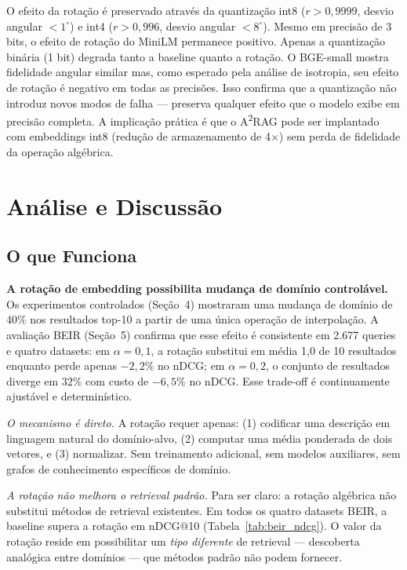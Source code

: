 \documentclass{article}
\begin{document}
O efeito da rotação é preservado através da quantização int8 ($r > 0{,}9999$, desvio angular $< 1^{\circ}$) e int4 ($r > 0{,}996$, desvio angular $< 8^{\circ}$). Mesmo em precisão de 3 bits, o efeito de rotação do MiniLM permanece positivo. Apenas a quantização binária (1 bit) degrada tanto a baseline quanto a rotação. O BGE-small mostra fidelidade angular similar mas, como esperado pela análise de isotropia, seu efeito de rotação é negativo em todas as precisões. Isso confirma que a quantização não introduz novos modos de falha --- preserva qualquer efeito que o modelo exibe em precisão completa. A implicação prática é que o A\textsuperscript{2}RAG pode ser implantado com embeddings int8 (redução de armazenamento de 4$\times$) sem perda de fidelidade da operação algébrica.

\section{Análise e Discussão}

\subsection{O que Funciona}

\textbf{A rotação de embedding possibilita mudança de domínio controlável.} Os experimentos controlados (Seção~4) mostraram uma mudança de domínio de 40\% nos resultados top-10 a partir de uma única operação de interpolação. A avaliação BEIR (Seção~5) confirma que esse efeito é consistente em 2.677 queries e quatro datasets: em $\alpha = 0{,}1$, a rotação substitui em média 1,0 de 10 resultados enquanto perde apenas $-2{,}2\%$ no nDCG; em $\alpha = 0{,}2$, o conjunto de resultados diverge em 32\% com custo de $-6{,}5\%$ no nDCG. Esse trade-off é continuamente ajustável e determinístico.

\emph{O mecanismo é direto.} A rotação requer apenas: (1) codificar uma descrição em linguagem natural do domínio-alvo, (2) computar uma média ponderada de dois vetores, e (3) normalizar. Sem treinamento adicional, sem modelos auxiliares, sem grafos de conhecimento específicos de domínio.

\emph{A rotação não melhora o retrieval padrão.} Para ser claro: a rotação algébrica não substitui métodos de retrieval existentes. Em todos os quatro datasets BEIR, a baseline supera a rotação em nDCG@10 (Tabela~\ref{tab:beir_ndcg}). O valor da rotação reside em possibilitar um \emph{tipo diferente} de retrieval --- descoberta analógica entre domínios --- que métodos padrão não podem fornecer.
\end{document}

